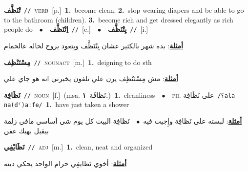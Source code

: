 \documentclass[10pt,a4paper,twoside]{article} %
\begin{document}
\begin{multicols}{2}
{\setlength\topsep{0pt}\textbf{\foreignlanguage{arabic}{تْنَظَّف}}\ {\color{gray}\texttt{//}\color{black}}\ \textsc{verb}\ [p.]\ \textbf{1.}~become clean.  \textbf{2.}~stop wearing diapers and be able to go to the bathroom (children).  \textbf{3.}~become rich and get dressed elegantly as rich people do\ \ $\bullet$\ \ \setlength\topsep{0pt}\textbf{\foreignlanguage{arabic}{اِتْنَظَّف}}\ {\color{gray}\texttt{//}\color{black}}\ [c.]\ \ $\bullet$\ \ \setlength\topsep{0pt}\textbf{\foreignlanguage{arabic}{يِتْنَظَّف}}\ {\color{gray}\texttt{//}\color{black}}\ [i.]\  \begin{flushright}\color{gray}\foreignlanguage{arabic}{\textbf{\underline{\foreignlanguage{arabic}{أمثلة}}}: بده شهر بالكثير عشان يِتْنَظَّف ويِتعود يروح لحاله عالحمام}\end{flushright}\color{black}} \vspace{2mm}

{\setlength\topsep{0pt}\textbf{\foreignlanguage{arabic}{مِسْتَنْظِف}}\ {\color{gray}\texttt{//}\color{black}}\ \textsc{noun\textunderscore act}\ [m.]\ \textbf{1.}~deigning to do sth\  \begin{flushright}\color{gray}\foreignlanguage{arabic}{\textbf{\underline{\foreignlanguage{arabic}{أمثلة}}}: مش مِسْتَنْظِف يرن علي تلفون يخبرني انه هو جاي علي}\end{flushright}\color{black}} \vspace{2mm}

{\setlength\topsep{0pt}\textbf{\foreignlanguage{arabic}{نَظَافِة}}\ {\color{gray}\texttt{//}\color{black}}\ \textsc{noun}\ [f.]\ \color{gray}(msa. \foreignlanguage{arabic}{نَظافَة}~\foreignlanguage{arabic}{\textbf{١.}})\color{black}\ \textbf{1.}~cleanliness\ \ $\bullet$\ \ \textsc{ph.} \color{gray} \foreignlanguage{arabic}{على نَظَافِة}\color{black}\ {\color{gray}\texttt{/{\sffamily ʕala na(dˤ)aːfe}/}\color{black}}\ \textbf{1.}~have just taken a shower\  \begin{flushright}\color{gray}\foreignlanguage{arabic}{\textbf{\underline{\foreignlanguage{arabic}{أمثلة}}}: لبسته على نَظافِة وإِجيت فيه\ $\bullet$\ \  نَظافِة البيت كل يوم شي أساسي مافي زلمة بيقبل بهيك عفن}\end{flushright}\color{black}} \vspace{2mm}

{\setlength\topsep{0pt}\textbf{\foreignlanguage{arabic}{نَظَايْفِي}}\ {\color{gray}\texttt{//}\color{black}}\ \textsc{adj}\ [m.]\ \textbf{1.}~clean, neat and organized\  \begin{flushright}\color{gray}\foreignlanguage{arabic}{\textbf{\underline{\foreignlanguage{arabic}{أمثلة}}}: أخوي نَظايفِي حرام الواحد يحكي دينه}\end{flushright}\color{black}} \vspace{2mm}


\end{multicols}
\end{document}
